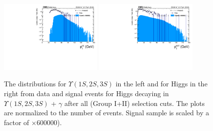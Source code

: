 \begin{figure}[!htbp]
\begin{center}
\includegraphics[width=0.45\textwidth]{figures/outputPlots/HtoUpsilon_Cat0_ZZZZZ/nEvts/data_x_mc/withKinCuts/h_withKin_Upsilon_Pt}\hspace*{1.cm}
\includegraphics[width=0.45\textwidth]{figures/outputPlots/HtoUpsilon_Cat0_ZZZZZ/nEvts/data_x_mc/withKinCuts/h_withKin_Z_Pt}
\end{center}\vspace*{-.5cm}
\caption{The \PT distributions for $\Upsilon(1S,2S,3S)$ in the left and for Higgs in the right from data and signal events for Higgs decaying in $\Upsilon(1S,2S,3S)$ + $\gamma$ after all (Group I+II) selection cuts. The plots are normalized to the number of events. Signal sample is scaled by a factor of $\times 600000$).}
\label{fig:pTUpsilon_and_Higgs_HtoUpsilon_Cat0_groupI_plus_II}
\end{figure}


